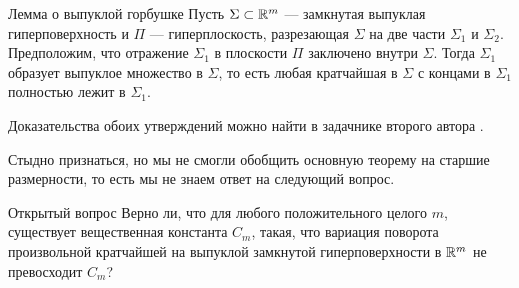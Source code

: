 \documentclass[a4paper,10pt]{article}
\begin{document}
\begin{thm}{Лемма о выпуклой горбушке}
Пусть $\Sigma\subset\mathbb{R}^m$ --- замкнутая выпуклая гиперповерхность и
$\Pi$ --- гиперплоскость, разрезающая $\Sigma$ на две части $\Sigma_1$ и $\Sigma_2$.
Предположим, что отражение $\Sigma_1$ в плоскости $\Pi$ заключено внутри  $\Sigma$.
Тогда $\Sigma_1$ образует выпуклое множество в $\Sigma$,
то есть любая кратчайшая в $\Sigma$ с концами в $\Sigma_1$ полностью лежит в $\Sigma_1$.
\end{thm}

Доказательства обоих утверждений можно найти в задачнике второго автора \cite{petrunin-orthodox}.

\medskip

Стыдно признаться, но мы не смогли обобщить основную теорему на старшие размерности,
то есть мы не знаем ответ на следующий вопрос.

\begin{thm}{Открытый вопрос}
Верно ли, что для любого положительного целого $m$,
существует вещественная константа $C_m$,
такая, что вариация поворота произвольной кратчайшей на выпуклой замкнутой гиперповерхности в $\mathbb{R}^m$ не превосходит $C_m$?
\end{thm}







\Addresses
\end{document}
